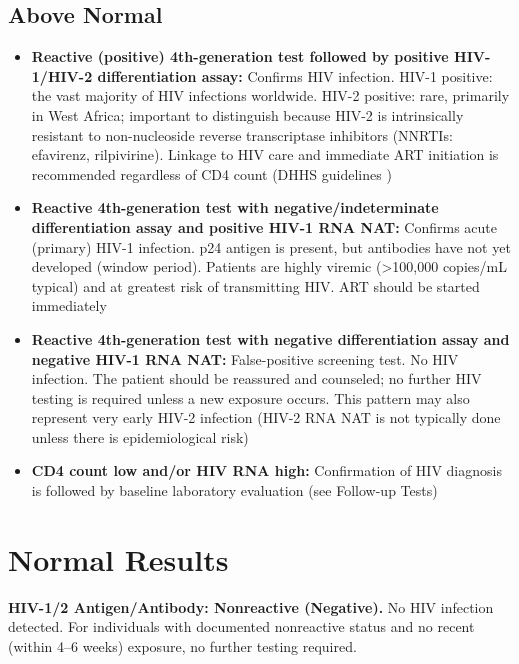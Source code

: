 \subsection*{Above Normal}
\begin{itemize}
  \item \textbf{Reactive (positive) 4th-generation test followed by positive HIV-1/HIV-2 differentiation assay:} Confirms HIV infection. HIV-1 positive: the vast majority of HIV infections worldwide. HIV-2 positive: rare, primarily in West Africa; important to distinguish because HIV-2 is intrinsically resistant to non-nucleoside reverse transcriptase inhibitors (NNRTIs: efavirenz, rilpivirine). Linkage to HIV care and immediate ART initiation is recommended regardless of CD4 count (DHHS guidelines \cite{dhhs2023guidelines})
  \item \textbf{Reactive 4th-generation test with negative/indeterminate differentiation assay and positive HIV-1 RNA NAT:} Confirms acute (primary) HIV-1 infection. p24 antigen is present, but antibodies have not yet developed (window period). Patients are highly viremic (>100,000 copies/mL typical) and at greatest risk of transmitting HIV. ART should be started immediately
  \item \textbf{Reactive 4th-generation test with negative differentiation assay and negative HIV-1 RNA NAT:} False-positive screening test. No HIV infection. The patient should be reassured and counseled; no further HIV testing is required unless a new exposure occurs. This pattern may also represent very early HIV-2 infection (HIV-2 RNA NAT is not typically done unless there is epidemiological risk)
  \item \textbf{CD4 count low and/or HIV RNA high:} Confirmation of HIV diagnosis is followed by baseline laboratory evaluation (see Follow-up Tests)
\end{itemize}

\section*{Normal Results}
\textbf{HIV-1/2 Antigen/Antibody: Nonreactive (Negative).} No HIV infection detected. For individuals with documented nonreactive status and no recent (within 4--6 weeks) exposure, no further testing required.

